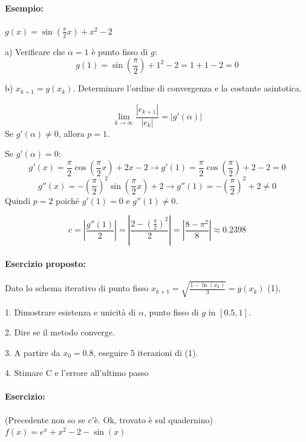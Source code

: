 \documentclass[a4paper, 11pt]{article}
\begin{document}
        \paragraph{Esempio:} $g(x) = \sin\left(\frac{\pi}{2} x\right) + x^2 - 2$

        a) Verificare che $\alpha = 1$ è punto fisso di $g$:
        $$
        g(1) = \sin\left(\frac{\pi}{2}\right) + 1^2 - 2 = 1 + 1 - 2 = 0
        $$
        
        b) $x_{k+1} = g(x_k)$. Determinare l'ordine di convergenza e la costante asintotica.
        
        $$
        \lim_{k \to \infty} \frac{|e_{k+1}|}{|e_k|} = |g'(\alpha)|
        $$
        Se $g'(\alpha) \neq 0$, allora $p = 1$.
        
        Se $g'(\alpha) = 0$:
        $$
        g'(x) = \frac{\pi}{2} \cos\left(\frac{\pi}{2} x\right) + 2x - 2 \rightarrow g'(1) = \frac{\pi}{2} \cos\left(\frac{\pi}{2}\right) + 2 - 2 = 0
        $$
        $$
        g''(x) = -\left(\frac{\pi}{2}\right)^2 \sin\left(\frac{\pi}{2} x\right) + 2 \rightarrow g''(1) = -\left(\frac{\pi}{2}\right)^2 + 2 \neq 0
        $$
        Quindi $p = 2$ poiché $g'(1) = 0$ e $g''(1) \neq 0$.
        
        $$
        c = \left|\frac{g''(1)}{2}\right| = \left|\frac{2 - \left(\frac{\pi}{2}\right)^2}{2}\right| = \left|\frac{8 - \pi^2}{8}\right| \approx 0.2398
        $$
        
        \paragraph{Esercizio proposto:} Dato lo schema iterativo di punto fisso $x_{k+1} = \sqrt{\frac{1 - \ln(x_k)}{3}} = g(x_k)$ (1),
        
        1. Dimostrare esistenza e unicità di $\alpha$, punto fisso di $g$ in $[0.5, 1]$.
        
        2. Dire se il metodo converge.
        
        3. A partire da $x_0 = 0.8$, eseguire 5 iterazioni di (1).
        
        4. Stimare C e l'errore all'ultimo passo
        
        \paragraph{Esercizio:} (Precedente non so se c'è. Ok, trovato è sul quadernino) $f(x) = e^x + x^2 - 2 - \sin(x)$
        







 
\end{document}
